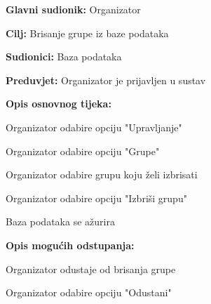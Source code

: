 					\noindent {}
					\begin{packed_item}
						
						\item \textbf{Glavni sudionik: }Organizator
						\item  \textbf{Cilj:} Brisanje grupe iz baze podataka
						\item  \textbf{Sudionici:} Baza podataka
						\item  \textbf{Preduvjet:} Organizator je prijavljen u sustav
						\item  \textbf{Opis osnovnog tijeka:}
						
						\item[] \begin{packed_enum}
							
							\item Organizator odabire opciju "Upravljanje"
							\item Organizator odabire opciju "Grupe"
							\item Organizator odabire grupu koju želi izbrisati
							\item Organizator odabire opciju "Izbriši grupu"
							\item Baza podataka se ažurira
						\end{packed_enum}
						
						\item  \textbf{Opis mogućih odstupanja:}
						
						\item[] \begin{packed_item}	
							\item[3.a] Organizator odustaje od brisanja grupe
							\item[] \begin{packed_enum}
								
								\item Organizator odabire opciju "Odustani"
								
							\end{packed_enum}

						\end{packed_item}
						
					\end{packed_item}
				
